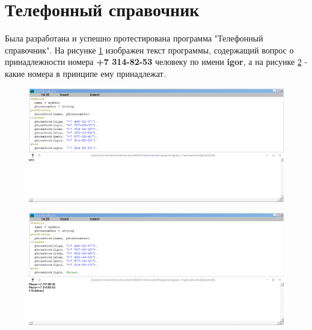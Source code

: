 \section{Телефонный справочник}
Была разработана и успешно протестирована программа "Телефонный справочник". На рисунке \ref{img:phonebook1} изображен текст программы, содержащий вопрос о принадлежности номера \textbf{+7 314-82-53} человеку по имени \textbf{igor}, а на рисунке \ref{img:phonebook2} - какие номера в принципе ему принадлежат.
\begin{figure}[H]
    \centering
    \includegraphics[scale=.5]{imgs/phonebook1.png}
    \caption{}
    \label{img:phonebook1}
\end{figure}
\begin{figure}[H]
    \centering
    \includegraphics[scale=.5]{imgs/phonebook2.png}
    \caption{}
    \label{img:phonebook2}
\end{figure}

